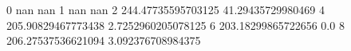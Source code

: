 0 nan nan
1 nan nan
2 244.47735595703125 41.29435729980469
4 205.90829467773438 2.7252960205078125
6 203.18299865722656 0.0
8 206.27537536621094 3.092376708984375

